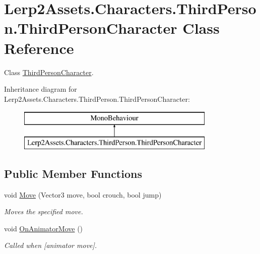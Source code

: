 \hypertarget{class_lerp2_assets_1_1_characters_1_1_third_person_1_1_third_person_character}{}\section{Lerp2\+Assets.\+Characters.\+Third\+Person.\+Third\+Person\+Character Class Reference}
\label{class_lerp2_assets_1_1_characters_1_1_third_person_1_1_third_person_character}


Class \hyperlink{class_lerp2_assets_1_1_characters_1_1_third_person_1_1_third_person_character}{Third\+Person\+Character}.  


Inheritance diagram for Lerp2\+Assets.\+Characters.\+Third\+Person.\+Third\+Person\+Character\+:\begin{figure}[H]
\begin{center}
\leavevmode
\includegraphics[height=2.000000cm]{class_lerp2_assets_1_1_characters_1_1_third_person_1_1_third_person_character}
\end{center}
\end{figure}
\subsection*{Public Member Functions}
\begin{DoxyCompactItemize}
\item 
void \hyperlink{class_lerp2_assets_1_1_characters_1_1_third_person_1_1_third_person_character_a77c2fadeedd2aaf3a0724e447149653c}{Move} (Vector3 move, bool crouch, bool jump)
\begin{DoxyCompactList}\small\item\em Moves the specified move. \end{DoxyCompactList}\item 
void \hyperlink{class_lerp2_assets_1_1_characters_1_1_third_person_1_1_third_person_character_a57f9dece2baed9289a97923fd8f0c4c2}{On\+Animator\+Move} ()
\begin{DoxyCompactList}\small\item\em Called when \mbox{[}animator move\mbox{]}. \end{DoxyCompactList}\end{DoxyCompactItemize}


